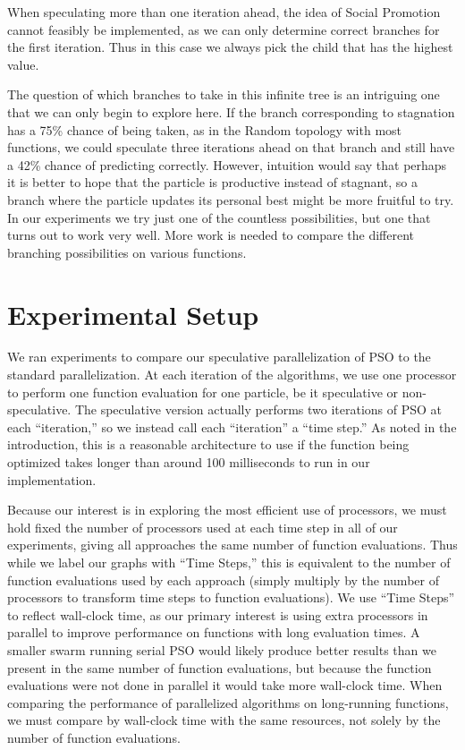 \documentclass[smallcondensed]{svjour3}
\begin{document}
When speculating more than one iteration ahead, the idea of Social Promotion
cannot feasibly be implemented, as we can only determine correct branches for
the first iteration.  Thus in this case we always pick the child that has the
highest value.

The question of which branches to take in this infinite tree is an intriguing
one that we can only begin to explore here.  If the branch corresponding to
stagnation has a 75\% chance of being taken, as in the Random topology with
most functions, we could speculate three iterations ahead on that branch and
still have a 42\% chance of predicting correctly.  However, intuition would say
that perhaps it is better to hope that the particle is productive instead of
stagnant, so a branch where the particle updates its personal best might be
more fruitful to try.  In our experiments we try just one of the countless
possibilities, but one that turns out to work very well.  More work is needed
to compare the different branching possibilities on various functions.

\section{Experimental Setup}
\label{sec:setup}

We ran experiments to compare our speculative parallelization of PSO to the
standard parallelization.  At each iteration of the algorithms, we use one
processor to perform one function evaluation for one particle, be it
speculative or non-speculative.  The speculative version actually performs two
iterations of PSO at each ``iteration,'' so we instead call each ``iteration''
a ``time step.''  As noted in the introduction, this is a reasonable
architecture to use if the function being optimized takes longer than around
100 milliseconds to run in our implementation.

Because our interest is in exploring the most efficient use of processors, we
must hold fixed the number of processors used at each time step in all of our
experiments, giving all approaches the same number of function evaluations.
Thus while we label our graphs with ``Time Steps,'' this is equivalent to the
number of function evaluations used by each approach (simply multiply by the
number of processors to transform time steps to function evaluations).  We use
``Time Steps'' to reflect wall-clock time, as our primary interest is using
extra processors in parallel to improve performance on functions with long
evaluation times.  A smaller swarm running serial PSO would likely produce
better results than we present in the same number of function evaluations, but
because the function evaluations were not done in parallel it would take more
wall-clock time.  When comparing the performance of parallelized algorithms on
long-running functions, we must compare by wall-clock time with the same
resources, not solely by the number of function evaluations.
\end{document}
